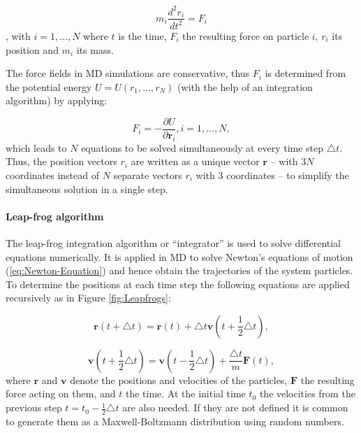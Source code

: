 \begin{equation} \label{eq:Newton-Equation} 
m_{i} \frac{d^{2}{r}_{i}} {d t^{2}} = {F}_{i} 
\end{equation}
, with $i=1,...,N$ 
where $t$ is the time, ${F}_{i}$ the resulting force on particle
$i$, ${r}_{i}$ its position and $m_{i}$ its mass.

The force fields in MD simulations are conservative, thus ${F}_{i}$
is determined from the potential energy $U=U(r_{1},...,r_{N})$ (with
the help of an integration algorithm) by applying:

\begin{equation}
{F}_{i}=-\frac{\partial U}{\partial\mathbf{r}_{i}}, i=1,...,N,\label{eq:Force-PotEnergy-derivative}
\end{equation}
which leads to $N$ equations to be solved simultaneously at every
time step $\triangle t$. Thus, the position vectors ${r}_{i}$
are written as a unique vector $\mathbf{r}$ -- with $3N$ coordinates
instead of $N$ separate vectors ${r}_{i}$ with 3 coordinates
-- to simplify the simultaneous solution in a single step.

\paragraph{Leap-frog algorithm }

The leap-frog integration algorithm or ``integrator'' is used to
solve differential equations numerically. It is applied in MD to solve
Newton's equations of motion (\ref{eq:Newton-Equation}) and hence
obtain the trajectories of the system particles. To determine the
positions at each time step the following equations are applied recursively
as in Figure \ref{fig:Leapfrogs}:

\begin{equation}
\mathbf{r}(t+\triangle t)=\mathbf{r}(t)+\triangle t\mathbf{v}(t+\frac{1}{2}\triangle t),\label{eq:leapfrog-r}
\end{equation}

\begin{equation}
\mathbf{v}(t+\frac{1}{2}\triangle t)=\mathbf{\mathbf{v}}(t-\frac{1}{2}\triangle t)+\frac{\triangle t}{m}\mathbf{F}(t),\label{eq:leapfrog-v}
\end{equation}
where $\mathbf{r}$ and $\mathbf{v}$ denote the positions and velocities
of the particles, $\mathbf{F}$ the resulting force acting on them,
and $t$ the time. At the initial time $t_{0}$ the velocities from
the previous step $t=t_{0}-\frac{1}{2}\triangle t$ are also needed.
If they are not defined it is common to generate them as a Maxwell-Boltzmann
distribution using random numbers.

